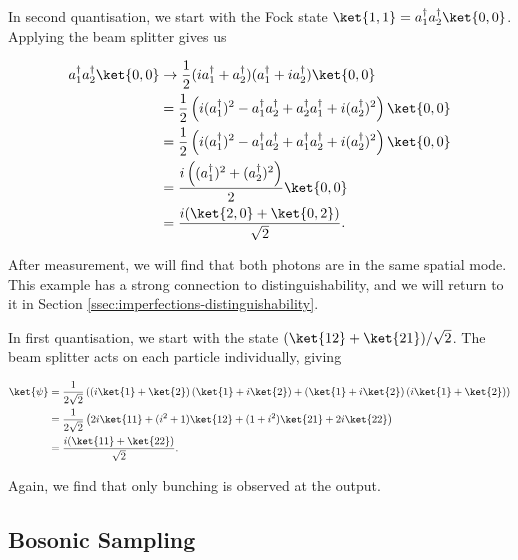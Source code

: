 In second quantisation, we start with the Fock state $\ket{1,1} = a_1^\dagger a_2^\dagger\ket{0,0}$. Applying the beam splitter gives us

\begin{align}
a_1^\dagger a_2^\dagger\ket{0,0} &\rightarrow \frac{1}{2}(ia_1^\dagger+a_2^\dagger)(a_1^\dagger+ia_2^\dagger)\ket{0,0}\\
&= \frac{1}{2}\left(i(a_1^\dagger)^2-a_1^\dagger a_2^\dagger+a_2^\dagger a_1^\dagger+i(a_2^\dagger)^2\right)\ket{0,0}\\
&= \frac{1}{2}\left(i(a_1^\dagger)^2-a_1^\dagger a_2^\dagger+a_1^\dagger a_2^\dagger+i(a_2^\dagger)^2\right)\ket{0,0}\\
&= \frac{i\left((a_1^\dagger)^2+(a_2^\dagger)^2\right)}{2}\ket{0,0}\\
&= \frac{i(\ket{2,0} + \ket{0,2})}{\sqrt{2}}.
\end{align}

After measurement, we will find that both photons are in the same spatial mode. This example has a strong connection to distinguishability, and we will return to it in Section \ref{ssec:imperfections-distinguishability}.

In first quantisation, we start with the state $(\ket{12} + \ket{21})/\sqrt{2}$. The beam splitter acts on each particle individually, giving

\begin{align}
\ket{\psi} &= \frac{1}{2\sqrt{2}}\left(\left(i\ket{1} + \ket{2}\right)\left(\ket{1} + i\ket{2}\right) + \left(\ket{1} + i\ket{2}\right)\left(i\ket{1} + \ket{2}\right)\right)\\
&= \frac{1}{2\sqrt{2}}\left(2i\ket{11} + (i^2+1)\ket{12} + (1+i^2)\ket{21} + 2i\ket{22}\right)\\
&= \frac{i(\ket{11}+\ket{22})}{\sqrt{2}}.
\end{align}

Again, we find that only bunching is observed at the output.

\subsection{Bosonic Sampling}
\label{ssec:bosonic-sampling}

